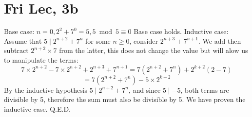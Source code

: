 \documentclass[12pt]{article}
\begin{document}
\section{Fri Lec, 3b}
Base case: $n = 0, 2^2+7^0 = 5, 5 \bmod 5 \equiv 0$ Base case holds.
\newline
Inductive case: Assume that $5 \mid 2^{n+2}+7^n$ for some $n \geq 0$, consider $2^{n+3}+7^{n+1}$.
\newline
We add then subtract $2^{n+2}\times 7$ from the latter, this does not change the value but will alow us to manipulate the terms:
$$7 \times 2^{n+2} - 7 \times 2^{n+2} + 2^{n+3}+7^{n+1} = 7(2^{n+2}+7^n)+2^{k+2}(2-7)$$
$$=7(2^{n+2}+7^n) - 5 \times 2^{k+2}$$
By the inductive hypothesis  $5 \mid 2^{n+2}+7^n$, and since $5 \mid -5$, both terms are divisible by 5, therefore the sum must also be divisible by 5.
\newline
We have proven the inductive case. Q.E.D.
\end{document}

